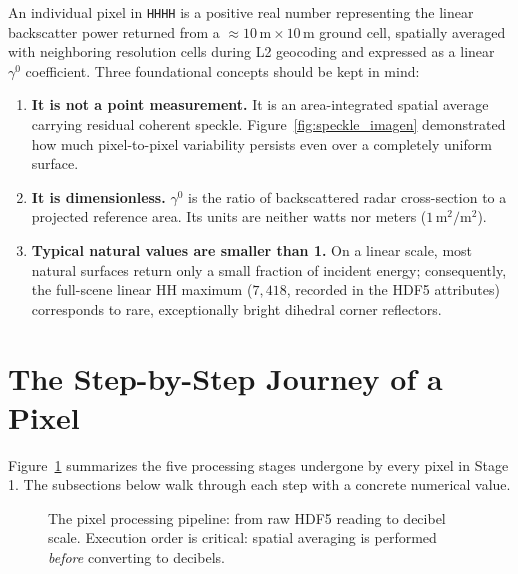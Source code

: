 \documentclass[11pt,a4paper]{article}
\begin{document}
An individual pixel in \texttt{HHHH} is a positive real number representing the linear backscatter power returned from a $\approx 10\,\text{m}\times 10\,\text{m}$ ground cell, spatially averaged with neighboring resolution cells during L2 geocoding and expressed as a linear $\gamma^0$ coefficient. Three foundational concepts should be kept in mind:
\begin{enumerate}
  \item \textbf{It is not a point measurement.} It is an area-integrated spatial average carrying residual coherent speckle. Figure~\ref{fig:speckle_imagen} demonstrated how much pixel-to-pixel variability persists even over a completely uniform surface.
  \item \textbf{It is dimensionless.} $\gamma^0$ is the ratio of backscattered radar cross-section to a projected reference area. Its units are neither watts nor meters ($1\,\text{m}^2/\text{m}^2$).
  \item \textbf{Typical natural values are smaller than 1.} On a linear scale, most natural surfaces return only a small fraction of incident energy; consequently, the full-scene linear HH maximum ($7,418$, recorded in the HDF5 attributes) corresponds to rare, exceptionally bright dihedral corner reflectors.
\end{enumerate}

\section{The Step-by-Step Journey of a Pixel}
\label{sec:recorrido}

Figure~\ref{fig:recorrido} summarizes the five processing stages undergone by every pixel in Stage 1. The subsections below walk through each step with a concrete numerical value.

\begin{figure}[htbp]
\centering
{}
\caption{The pixel processing pipeline: from raw HDF5 reading to decibel scale. Execution order is critical: spatial averaging is performed \emph{before} converting to decibels.}
\label{fig:recorrido}
\end{figure}
\end{document}
